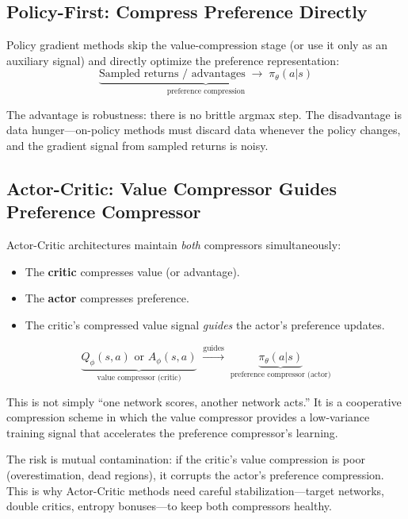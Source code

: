 \subsection{Policy-First: Compress Preference Directly}

Policy gradient methods skip the value-compression stage (or use it only as an
auxiliary signal) and directly optimize the preference representation:
\begin{equation}
  \underbrace{\text{Sampled returns / advantages}
  \;\longrightarrow\; \pi_\theta(a|s)}_{\text{preference compression}}
\end{equation}

The advantage is robustness: there is no brittle argmax step.  The disadvantage
is data hunger---on-policy methods must discard data whenever the policy
changes, and the gradient signal from sampled returns is noisy.

\subsection{Actor-Critic: Value Compressor Guides Preference Compressor}

Actor-Critic architectures maintain \emph{both} compressors simultaneously:
\begin{itemize}[nosep]
  \item The \textbf{critic} compresses value (or advantage).
  \item The \textbf{actor} compresses preference.
  \item The critic's compressed value signal \emph{guides} the actor's
    preference updates.
\end{itemize}

\begin{equation}
  \underbrace{Q_\phi(s,a) \text{ or } A_\phi(s,a)}_{\text{value compressor (critic)}}
  \;\xrightarrow{\text{guides}}\;
  \underbrace{\pi_\theta(a|s)}_{\text{preference compressor (actor)}}
\end{equation}

This is not simply ``one network scores, another network acts.''  It is a
cooperative compression scheme in which the value compressor provides a
low-variance training signal that accelerates the preference compressor's
learning.

The risk is mutual contamination: if the critic's value compression is poor
(overestimation, dead regions), it corrupts the actor's preference compression.
This is why Actor-Critic methods need careful stabilization---target networks,
double critics, entropy bonuses---to keep both compressors healthy.


